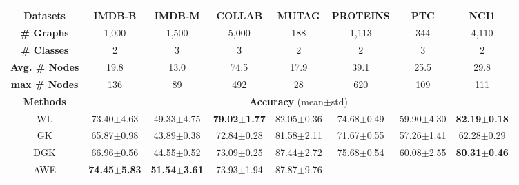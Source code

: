 \documentclass{article}
\newcommand{\our}{\textsc{Seg-Bert}}
\begin{document}
\begin{table*}[t]
\caption{Experimental results of different comparison methods. For the results not reported in the previous works, we mark the corresponding entries with `$-$' in the table. The entries are the accuracy scores (mean$\pm$std) achieved by the baseline methods with the $10$ folds. For {\our}(padding/pruning, none) and {\our}(padding/pruning, raw), they denote {\our} with the \textit{padding/pruning} strategy and different graph residual terms (raw vs none). At the last row on {\our}*, we show the best results obtained by {\our} with all these three unification strategies.}\label{tab:result}
\vspace{-5pt}
\centering
\small
\setlength{\tabcolsep}{3pt}
\renewcommand{\arraystretch}{1.2}
\begin{tabular}{c|c|c|c|c|c|c|c}
\hline
\textbf{Datasets} &\textbf{IMDB-B} &\textbf{IMDB-M} &\textbf{COLLAB} &\textbf{MUTAG}  &\textbf{PROTEINS} &\textbf{PTC} &\textbf{NCI1}\\
\hline
\textbf{\# Graphs} &1,000 &1,500 &5,000 &188  &1,113 &344 &4,110 \\
\textbf{\# Classes} &2 &3 &3 &2  &2 &3 &2\\
\textbf{Avg. \# Nodes} &19.8 &13.0 &74.5 &17.9 &39.1 &25.5 &29.8\\
\textbf{max \# Nodes} &136 &89 &492 &28 &620 &109 &111\\
\hline
\hline
\textbf{Methods} & \multicolumn{7}{c}{\textbf{Accuracy} (mean$\pm$std)}\\
\hline

WL {\scriptsize \cite{Shervashidze_WL_11}} &73.40$\pm$4.63 &49.33$\pm$4.75 &\textbf{79.02$\pm$1.77} &82.05$\pm$0.36 &74.68$\pm$0.49 &59.90$\pm$4.30 &\textbf{82.19$\pm$0.18} \\

GK {\scriptsize \cite{pmlr-v5-shervashidze09a}} &65.87$\pm$0.98&43.89$\pm$0.38  &72.84$\pm$0.28&81.58$\pm$2.11&71.67$\pm$0.55&57.26$\pm$1.41&62.28$\pm$0.29 \\

\hline

DGK {\scriptsize \cite{Yanardag_Deep_15}} &66.96$\pm$0.56&44.55$\pm$0.52 &73.09$\pm$0.25&87.44$\pm$2.72&75.68$\pm$0.54&60.08$\pm$2.55&\textbf{80.31$\pm$0.46} \\

AWE {\scriptsize \cite{Ivanov_Anonymous_18}} &\textbf{74.45$\pm$5.83}&\textbf{51.54$\pm$3.61} &73.93$\pm$1.94&87.87$\pm$9.76&$-$&$-$&$-$ \\


\end{tabular}
\end{table*}
\end{document}
